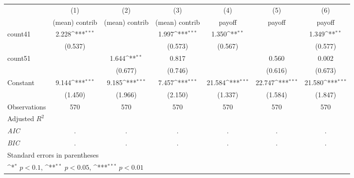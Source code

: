 {
\def\sym#1{\ifmmode^{#1}\else\(^{#1}\)\fi}
\begin{tabular}{l*{6}{c}}
\hline\hline
                    &\multicolumn{1}{c}{(1)}&\multicolumn{1}{c}{(2)}&\multicolumn{1}{c}{(3)}&\multicolumn{1}{c}{(4)}&\multicolumn{1}{c}{(5)}&\multicolumn{1}{c}{(6)}\\
                    &\multicolumn{1}{c}{(mean) contrib}&\multicolumn{1}{c}{(mean) contrib}&\multicolumn{1}{c}{(mean) contrib}&\multicolumn{1}{c}{payoff}&\multicolumn{1}{c}{payoff}&\multicolumn{1}{c}{payoff}\\
\hline
count41             &       2.228\sym{***}&                     &       1.997\sym{***}&       1.350\sym{**} &                     &       1.349\sym{**} \\
                    &     (0.537)         &                     &     (0.573)         &     (0.567)         &                     &     (0.577)         \\
[1em]
count51             &                     &       1.644\sym{**} &       0.817         &                     &       0.560         &       0.002         \\
                    &                     &     (0.677)         &     (0.746)         &                     &     (0.616)         &     (0.673)         \\
[1em]
Constant            &       9.144\sym{***}&       9.185\sym{***}&       7.457\sym{***}&      21.584\sym{***}&      22.747\sym{***}&      21.580\sym{***}\\
                    &     (1.450)         &     (1.966)         &     (2.150)         &     (1.337)         &     (1.584)         &     (1.847)         \\
\hline
Observations        &         570         &         570         &         570         &         570         &         570         &         570         \\
Adjusted \(R^{2}\)  &                     &                     &                     &                     &                     &                     \\
\textit{AIC}        &           .         &           .         &           .         &           .         &           .         &           .         \\
\textit{BIC}        &           .         &           .         &           .         &           .         &           .         &           .         \\
\hline\hline
\multicolumn{7}{l}{\footnotesize Standard errors in parentheses}\\
\multicolumn{7}{l}{\footnotesize \sym{*} \(p<0.1\), \sym{**} \(p<0.05\), \sym{***} \(p<0.01\)}\\
\end{tabular}
}
